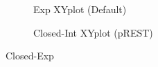\documentclass[T4paper.tex]{subfiles}
\begin{document}
\begin{figure}
\centering
\begin{subfigure}{.5\textwidth}
  \centering
   \caption{Exp XYplot (Default)}
   \label{fig:exp_xyplot}
\end{subfigure}%
\begin{subfigure}{.5\textwidth}
   \centering
   \caption{Closed-Int XYplot (pREST)}
   \label{fig:exp_xyplot_pREST}
\end{subfigure}
\caption{Closed-Exp}
\label{fig:exp_xy}
\end{figure}
\end{document}

